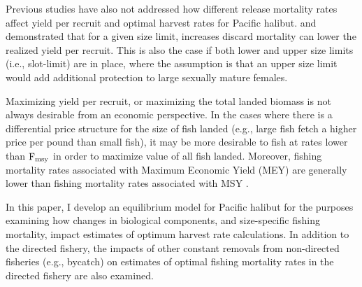 Previous studies have also not addressed how different release mortality rates affect  yield per recruit and optimal harvest rates for Pacific halibut.  \cite{coggins2007ecm} and \cite{pineiii2008car} demonstrated that for a given size limit, increases discard mortality can lower the realized yield per recruit. This is also the case if both lower and upper size limits (i.e., slot-limit) are in place, where the assumption is that an upper size limit would add additional protection to large sexually mature females.

Maximizing  yield per recruit, or maximizing the total landed biomass is not always desirable from an economic perspective.  In the cases where there is a differential price structure for the size of fish landed (e.g., large fish fetch a higher price per pound  than small fish), it may be more desirable to fish at rates lower than $\rm{F_{msy}}$ in order to maximize value of all fish landed.  Moreover, fishing mortality rates associated with Maximum Economic Yield (MEY) are generally lower than fishing mortality rates associated with MSY \citep{gordon1954economic}.

In this paper, I develop an equilibrium model for Pacific halibut for the purposes examining how changes in biological components, and size-specific fishing mortality, impact estimates of optimum harvest rate calculations.  In addition to the directed fishery, the impacts of other constant removals from non-directed fisheries (e.g., bycatch) on estimates of optimal fishing mortality rates in the directed fishery are also examined.





